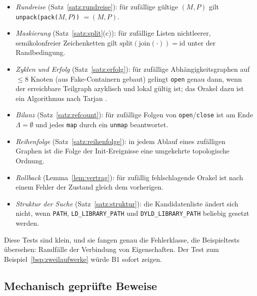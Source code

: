 \begin{itemize}
	\item \emph{Rundreise} (Satz~\ref{satz:rundreise}): für zufällige gültige $(M,P)$ gilt \texttt{unpack(pack($M,P$))} $=(M,P)$.
	\item \emph{Maskierung} (Satz~\ref{satz:split}(c)): für zufällige Listen nichtleerer, semikolonfreier Zeichenketten gilt $\mathrm{split}(\mathrm{join}(\cdot))=\mathrm{id}$ unter der Randbedingung.
	\item \emph{Zyklen und Erfolg} (Satz~\ref{satz:erfolg}): für zufällige Abhängigkeitsgraphen auf $\le 8$ Knoten (aus Fake-Containern gebaut) gelingt \texttt{open} genau dann, wenn der erreichbare Teilgraph azyklisch und lokal gültig ist; das Orakel dazu ist ein Algorithmus nach Tarjan \cite{tarjan1972}.
	\item \emph{Bilanz} (Satz~\ref{satz:refcount}): für zufällige Folgen von \texttt{open}/\texttt{close} ist am Ende $\Lambda=\emptyset$ und jedes \texttt{map} durch ein \texttt{unmap} beantwortet.
	\item \emph{Reihenfolge} (Satz~\ref{satz:reihenfolge}): in jedem Ablauf eines zufälligen Graphen ist die Folge der Init-Ereignisse eine umgekehrte topologische Ordnung.
	\item \emph{Rollback} (Lemma~\ref{lem:vertrag}): für zufällig fehlschlagende Orakel ist nach einem Fehler der Zustand gleich dem vorherigen.
	\item \emph{Struktur der Suche} (Satz~\ref{satz:struktur}): die Kandidatenliste ändert sich nicht, wenn \texttt{PATH}, \texttt{LD\_LIBRARY\_PATH} und \texttt{DYLD\_LIBRARY\_PATH} beliebig gesetzt werden.
\end{itemize}

Diese Tests sind klein, und sie fangen genau die Fehlerklasse, die Beispieltests übersehen: Randfälle der Verbindung von Eigenschaften. Der Test zum Beispiel~\ref{bsp:zweilaufwerke} würde B1 sofort zeigen.

\subsection{Mechanisch geprüfte Beweise}

